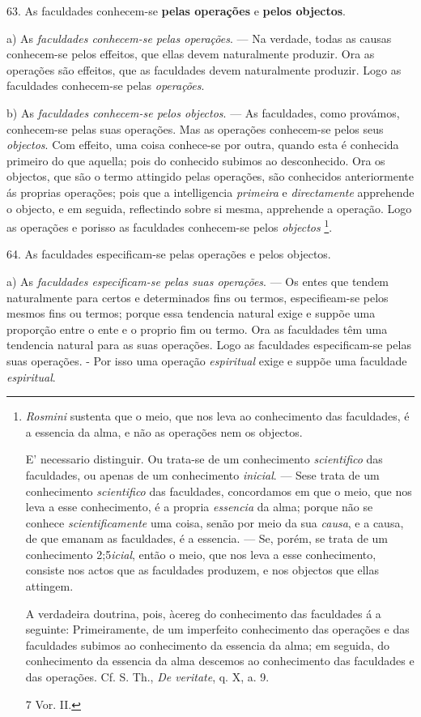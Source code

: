 63. As faculdades conhecem-se \textbf{pelas operações} e \textbf{pelos objectos}.

a) As \emph{faculdades conhecem-se pelas operações}. --- Na verdade, todas as causas conhecem-se pelos effeitos, que ellas devem naturalmente produzir. Ora as operações são effeitos, que as faculdades devem naturalmente produzir. Logo as faculdades conhecem-se pelas \emph{operações}.

b) As \emph{faculdades conhecem-se pelos objectos}. --- As faculdades, como provámos, conhecem-se pelas suas operações. Mas as operações conhecem-se pelos seus \emph{objectos}. Com effeito, uma coisa conhece-se por outra, quando esta é conhecida primeiro do que aquella; pois do conhecido subimos ao desconhecido. Ora os objectos, que são o termo attingido pelas operações, são conhecidos anteriormente ás proprias operações; pois que a intelligencia \emph{primeira} e \emph{directamente} apprehende o objecto, e em seguida, reflectindo sobre si mesma, apprehende a operação. Logo as operações e porisso as faculdades conhecem-se pelos \emph{objectos} \footnote{\emph{Rosmini} sustenta que o meio, que nos leva ao conhecimento das faculdades, é a essencia da alma, e não as operações nem os objectos.\par E' necessario distinguir. Ou trata-se de um conhecimento \emph{scientifico} das faculdades, ou apenas de um conhecimento \emph{inicial}. --- Sese trata de um conhecimento \emph{scientifico} das faculdades, concordamos em que o meio, que nos leva a esse conhecimento, é a propria \emph{essencia} da alma; porque não se conhece \emph{scientificamente} uma coisa, senão por meio da sua \emph{causa}, e a causa, de que emanam as faculdades, é a essencia. --- Se, porém, se trata de um conhecimento 2;5\emph{icial}, então o meio, que nos leva a esse conhecimento, consiste nos actos que as faculdades produzem, e nos objectos que ellas attingem.\par A verdadeira doutrina, pois, àcereg do conhecimento das faculdades á a seguinte: Primeiramente, de um imperfeito conhecimento das operações e das faculdades subimos ao conhecimento da essencia da alma; em seguida, do conhecimento da essencia da alma descemos ao conhecimento das faculdades e das operações. Cf. S. Th., \emph{De veritate}, q. X, a. 9.\par 7 Vor. II.}.

64. As faculdades especificam-se pelas operações e pelos objectos.

a) As \emph{faculdades especificam-se pelas suas operações}. --- Os entes que tendem naturalmente para certos e determinados fins ou termos, especifieam-se pelos mesmos fins ou termos; porque essa tendencia natural exige e suppõe uma proporção   entre o ente e o proprio fim ou termo. Ora as faculdades têm uma tendencia natural para as suas operações. Logo as faculdades especificam-se pelas suas operações. - Por isso uma operação \emph{espiritual} exige e suppõe uma faculdade \emph{espiritual}.

